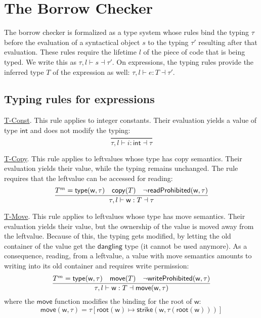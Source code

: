 \section{The Borrow Checker}\label{sec:borrow_checker}

The borrow checker is formalized as a type system whose rules
bind the typing $\tau$ before the evaluation of a syntactical object $s$ to
the typing $\tau'$ resulting after that evaluation.
These rules require the lifetime $l$ of the piece of code that is being typed.
We write this as $\tau,l\vdash s\dashv\tau'$.
On expressions, the typing
rules provide the inferred type $T$ of the expression as well:
$\tau,l\vdash e:T\dashv\tau'$.

\subsection{Typing rules for expressions}

\underline{\textsf{T-Const}}.
This rule applies to integer constants. Their evaluation
yields a value of type $\mathsf{int}$ and does not modify the typing:
\[
\frac
    {}
    {\tau,l\vdash i:\mathsf{int}\dashv\tau}
\]

\noindent
\underline{\textsf{T-Copy}}.
This rule applies to leftvalues whose type
has copy semantics. Their evaluation yields their value, while
the typing remains unchanged. The rule requires that the leftvalue
can be accessed for reading:
\[
\frac
    {T^m=\mathsf{type}(\mathsf{w},\tau)\quad\mathsf{copy}(T)\quad\neg\mathsf{readProhibited}(\mathsf{w},\tau)}
    {\tau,l\vdash\mathsf{w}:T\dashv\tau}
\]

\noindent
\underline{\textsf{T-Move}}.
This rule applies to leftvalues whose type
has move semantics. Their evaluation yields their value,
but the ownership of the value is moved away from the leftvalue. Because of this,
the typing gets modified, by letting the old container of the value
get the $\mathsf{dangling}$ type (it cannot be used anymore).
As a consequence, reading, from a leftvalue, a value with move semantics
amounts to writing into its old container and requires write permission:
\[
\frac
    {T^m=\mathsf{type}(\mathsf{w},\tau)\quad\mathsf{move}(T)\quad\neg\mathsf{writeProhibited}(\mathsf{w},\tau)}
    {\tau,l\vdash\mathsf{w}:T\dashv\mathsf{move}(\mathsf{w},\tau)}
\]
where the $\mathsf{move}$ function
modifies the binding for the root of $\mathsf{w}$:
\[
\mathsf{move}(\mathsf{w},\tau)=\tau[\mathsf{root}(\mathsf{w})\mapsto
  \mathsf{strike}(\mathsf{w},\tau(\mathsf{root}(\mathsf{w})))]
\]

